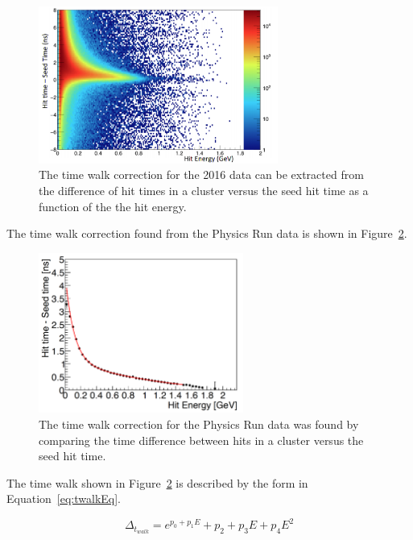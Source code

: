 \begin{figure}[H]
  \centering
      \includegraphics[width=0.7\textwidth]{pics/performance/hittimeincluster.png}
  \caption[Hit times in a cluster versus the hit energy]{The time walk correction for the 2016 data can be extracted from the difference of hit times in a cluster versus the seed hit time as a function of the the hit energy.}
  \label{Figure:hittimeincluster}
\end{figure}

The time walk correction found from the Physics Run data is shown in Figure~\ref{Figure:twalk}. 

\begin{figure}[H]
  \centering
      \includegraphics[width=0.6\textwidth]{pics/performance/twalk2016.png}
  \caption[Time walk correction for the Physics Run ECal data]{The time walk correction for the Physics Run data was found by comparing the time difference between hits in a cluster versus the seed hit time.}
  \label{Figure:twalk}
\end{figure}

The time walk shown in Figure~\ref{Figure:twalk} is described by the form in Equation~\eqref{eq:twalkEq}.

\begin{equation}
	\label{eq:twalkEq}
		\Delta_{t_{walk}} = e^{p_0+p_1E}+p_2+p_3E+p_4E^2	
\end{equation}

